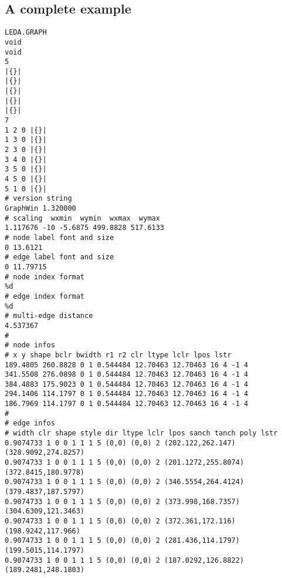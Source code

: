 \subsection{A complete example}
\begin{verbatim}
LEDA.GRAPH
void
void
5
|{}|
|{}|
|{}|
|{}|
|{}|
7
1 2 0 |{}|
1 3 0 |{}|
2 3 0 |{}|
3 4 0 |{}|
3 5 0 |{}|
4 5 0 |{}|
5 1 0 |{}|
# version string
GraphWin 1.320000
# scaling  wxmin  wymin  wxmax  wymax
1.117676 -10 -5.6875 499.8828 517.6133
# node label font and size
0 13.6121
# edge label font and size
0 11.79715
# node index format
%d
# edge index format
%d
# multi-edge distance
4.537367
# 
# node infos
# x y shape bclr bwidth r1 r2 clr ltype lclr lpos lstr
189.4805 260.8828 0 1 0.544484 12.70463 12.70463 16 4 -1 4 
341.5508 276.0898 0 1 0.544484 12.70463 12.70463 16 4 -1 4 
384.4883 175.9023 0 1 0.544484 12.70463 12.70463 16 4 -1 4 
294.1406 114.1797 0 1 0.544484 12.70463 12.70463 16 4 -1 4 
186.7969 114.1797 0 1 0.544484 12.70463 12.70463 16 4 -1 4 
# 
# edge infos
# width clr shape style dir ltype lclr lpos sanch tanch poly lstr
0.9074733 1 0 0 1 1 1 5 (0,0) (0,0) 2 (202.122,262.147) (328.9092,274.8257) 
0.9074733 1 0 0 1 1 1 5 (0,0) (0,0) 2 (201.1272,255.8074) (372.8415,180.9778) 
0.9074733 1 0 0 1 1 1 5 (0,0) (0,0) 2 (346.5554,264.4124) (379.4837,187.5797) 
0.9074733 1 0 0 1 1 1 5 (0,0) (0,0) 2 (373.998,168.7357) (304.6309,121.3463) 
0.9074733 1 0 0 1 1 1 5 (0,0) (0,0) 2 (372.361,172.116) (198.9242,117.966) 
0.9074733 1 0 0 1 1 1 5 (0,0) (0,0) 2 (281.436,114.1797) (199.5015,114.1797) 
0.9074733 1 0 0 1 1 1 5 (0,0) (0,0) 2 (187.0292,126.8822) (189.2481,248.1803) 
\end{verbatim}